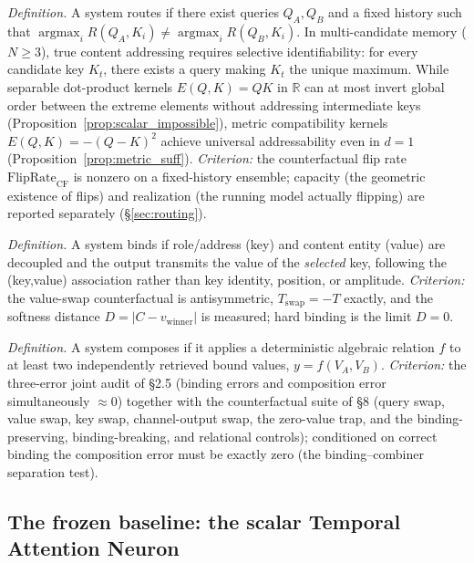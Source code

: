 \begin{description}[style=nextline,leftmargin=2em]
\item[P3 --- Content routing.] \emph{Definition.} A system routes if there
exist queries $Q_A,Q_B$ and a fixed history such that
$\operatorname{argmax}_i R(Q_A,K_i)\neq\operatorname{argmax}_i R(Q_B,K_i)$.
In multi-candidate memory ($N\ge3$), true content addressing requires selective
identifiability: for every candidate key $K_t$, there exists a query making $K_t$ the
unique maximum. While separable dot-product kernels $E(Q, K) = Q K$ in $\mathbb{R}$
can at most invert global order between the extreme elements without addressing intermediate keys
(Proposition~\ref{prop:scalar_impossible}), metric compatibility kernels $E(Q, K) = -(Q-K)^2$
achieve universal addressability even in $d=1$ (Proposition~\ref{prop:metric_suff}).
\emph{Criterion:} the counterfactual flip rate
$\mathrm{FlipRate}_{\mathrm{CF}}$ is nonzero on a fixed-history ensemble;
capacity (the geometric existence of flips) and realization (the running
model actually flipping) are reported separately (\S\ref{sec:routing}).
\item[P4 --- Semantic binding.] \emph{Definition.} A system binds if
role/address (key) and content entity (value) are decoupled and the output
transmits the value of the \emph{selected} key, following the
(key,value) association rather than key identity, position, or amplitude.
\emph{Criterion:} the value-swap counterfactual is antisymmetric,
$T_{\mathrm{swap}}=-T$ exactly, and the softness distance
$D=|C-v_{\mathrm{winner}}|$ is measured; hard binding is the limit $D=0$.
\item[P5 --- Composition.] \emph{Definition.} A system composes if it applies
a deterministic algebraic relation $f$ to at least two independently
retrieved bound values, $y=f(V_A,V_B)$. \emph{Criterion:} the three-error
joint audit of §2.5 (binding errors and composition error simultaneously
$\approx0$) together with the counterfactual suite of §8 (query swap, value
swap, key swap, channel-output swap, the zero-value trap, and the
binding-preserving, binding-breaking, and relational controls); conditioned
on correct binding the composition error must be exactly zero (the
binding--combiner separation test).
\end{description}

\subsection{The frozen baseline: the scalar Temporal Attention Neuron}
\label{sec:baseline}


